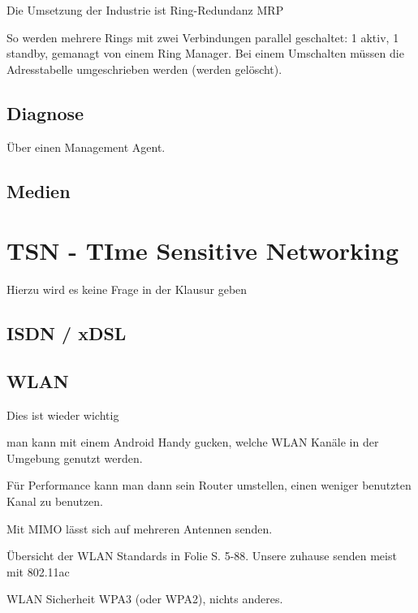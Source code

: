 \documentclass[a4paper]{article}
\begin{document}
Die Umsetzung der Industrie ist Ring-Redundanz MRP

So werden mehrere Rings mit zwei Verbindungen parallel geschaltet: 1 aktiv, 1 standby, gemanagt von einem Ring Manager. Bei einem Umschalten müssen die Adresstabelle umgeschrieben werden (werden gelöscht).

\subsection{Diagnose}

Über einen Management Agent.


\subsection{Medien}


\section{TSN - TIme Sensitive Networking}

Hierzu wird es keine Frage in der Klausur geben


\subsection{ISDN / xDSL}


\subsection{WLAN}

Dies ist wieder wichtig

man kann mit einem Android Handy gucken, welche WLAN Kanäle in der Umgebung genutzt werden.

Für Performance kann man dann sein Router umstellen, einen weniger benutzten Kanal zu benutzen.


Mit MIMO lässt sich auf mehreren Antennen senden.

Übersicht der WLAN Standards in Folie S. 5-88. Unsere zuhause senden meist mit 802.11ac

WLAN Sicherheit WPA3 (oder WPA2), nichts anderes.
\end{document}
